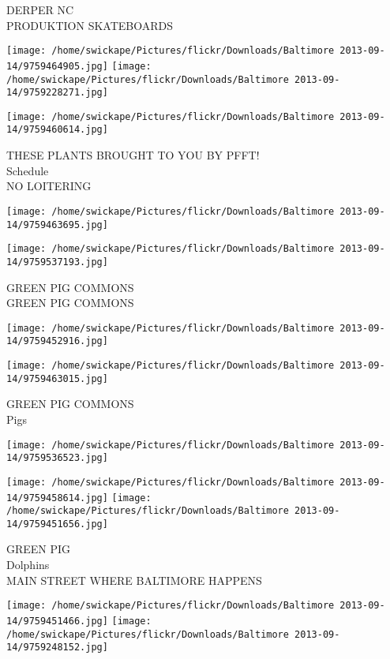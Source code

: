 \documentclass[10pt,letterpaper]{article}
\begin{document}
DERPER NC\\
PRODUKTION SKATEBOARDS
\pagebreak

\texttt{[image: /home/swickape/Pictures/flickr/Downloads/Baltimore 2013-09-14/9759464905.jpg]}
\texttt{[image: /home/swickape/Pictures/flickr/Downloads/Baltimore 2013-09-14/9759228271.jpg]}

\vspace{0.25in}
\texttt{[image: /home/swickape/Pictures/flickr/Downloads/Baltimore 2013-09-14/9759460614.jpg]}

THESE PLANTS BROUGHT TO YOU BY PFFT!\\
Schedule\\
NO LOITERING
\pagebreak

\texttt{[image: /home/swickape/Pictures/flickr/Downloads/Baltimore 2013-09-14/9759463695.jpg]}

\vspace{0.25in}
\texttt{[image: /home/swickape/Pictures/flickr/Downloads/Baltimore 2013-09-14/9759537193.jpg]}

GREEN PIG COMMONS\\
GREEN PIG COMMONS
\pagebreak

\texttt{[image: /home/swickape/Pictures/flickr/Downloads/Baltimore 2013-09-14/9759452916.jpg]}

\vspace{0.25in}
\texttt{[image: /home/swickape/Pictures/flickr/Downloads/Baltimore 2013-09-14/9759463015.jpg]}

GREEN PIG COMMONS\\
Pigs
\pagebreak

\texttt{[image: /home/swickape/Pictures/flickr/Downloads/Baltimore 2013-09-14/9759536523.jpg]}

\vspace{0.25in}
\texttt{[image: /home/swickape/Pictures/flickr/Downloads/Baltimore 2013-09-14/9759458614.jpg]}
\texttt{[image: /home/swickape/Pictures/flickr/Downloads/Baltimore 2013-09-14/9759451656.jpg]}

GREEN PIG\\
Dolphins\\
MAIN STREET WHERE BALTIMORE HAPPENS
\pagebreak

\texttt{[image: /home/swickape/Pictures/flickr/Downloads/Baltimore 2013-09-14/9759451466.jpg]}
\texttt{[image: /home/swickape/Pictures/flickr/Downloads/Baltimore 2013-09-14/9759248152.jpg]}
\end{document}
